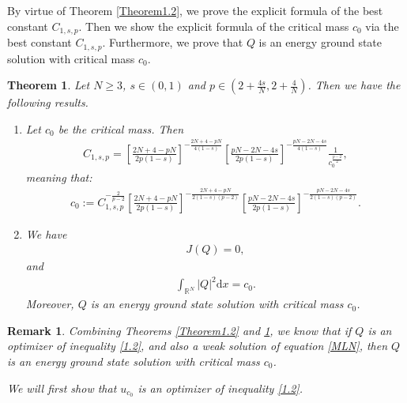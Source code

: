 \documentclass[12pt,a4paper,reqno]{amsart}
\numberwithin{equation}{section}
\newtheorem{theorem}{Theorem}[section]
\newtheorem{remark}{Remark}[section]
\begin{document}
By virtue of Theorem \ref{Theorem1.2},
we prove the explicit formula of the best constant $C_{1,s,p}$.
Then we show the explicit formula of the critical mass $c_{0}$ via the best constant $C_{1,s,p}$.
Furthermore,
we prove that $Q$ is an energy ground state solution with critical mass $c_{0}$.
\begin{theorem}\label{Theorem1.3}
Let $N\geqslant3$,
$s\in(0,1)$
and $p\in(2+\frac{4s}{N},2+\frac{4}{N})$.
Then we have the following results.

\begin{enumerate}
\item
Let $c_{0}$ be the critical mass.
Then
\begin{equation*}
\begin{aligned}
C_{1,s,p}
=\left[
\frac{2N+4-pN}{2p(1-s)}
\right]^{-\frac{2N+4-pN}{4(1-s)}}
\left[
\frac{pN-2N-4s}{2p(1-s)}
\right]^{-\frac{pN-2N-4s}{4(1-s)}}
\frac{1}{c_{0}^{\frac{p-2}{2}}},
\end{aligned}
\end{equation*}
meaning that:
\begin{equation*}
\begin{aligned}
c_{0}:=C_{1,s,p}^{-\frac{2}{p-2}}
\left[
\frac{2N+4-pN}{2p(1-s)}
\right]^{-\frac{2N+4-pN}{2(1-s)(p-2)}}
\left[
\frac{pN-2N-4s}{2p(1-s)}
\right]^{-\frac{pN-2N-4s}{2(1-s)(p-2)}}.
\end{aligned}
\end{equation*}

\item
We have
\begin{equation*}
\begin{aligned}
J(Q)=0,
\end{aligned}
\end{equation*}
and
\begin{equation*}
\begin{aligned}
\int_{\mathbb{R}^{N}}
|Q|^{2}
\mathrm{d}x=c_{0}.
\end{aligned}
\end{equation*}
Moreover,
$Q$ is an energy ground state solution with critical mass $c_{0}$.
\end{enumerate}

\end{theorem}

\begin{remark}
Combining Theorems \ref{Theorem1.2} and \ref{Theorem1.3},
we know that if $Q$ is an optimizer of inequality \eqref{1.2},
and also a weak solution of equation \eqref{MLN},
then $Q$ is an energy ground state solution with critical mass $c_{0}$.

We will first show that $u_{c_{0}}$ is an optimizer of inequality \eqref{1.2}.
\end{remark}
\end{document}
